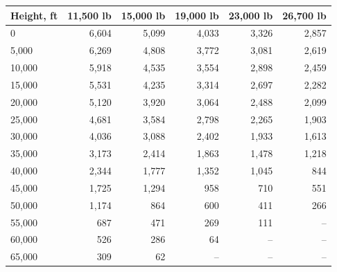 \begin{tabular}{@{}lrrrrr@{}}
\toprule
Height, ft & 11,500 lb & 15,000 lb & 19,000 lb & 23,000 lb & 26,700 lb \\
\midrule
0 & 6,604 & 5,099 & 4,033 & 3,326 & 2,857 \\
5,000 & 6,269 & 4,808 & 3,772 & 3,081 & 2,619 \\
10,000 & 5,918 & 4,535 & 3,554 & 2,898 & 2,459 \\
15,000 & 5,531 & 4,235 & 3,314 & 2,697 & 2,282 \\
20,000 & 5,120 & 3,920 & 3,064 & 2,488 & 2,099 \\
25,000 & 4,681 & 3,584 & 2,798 & 2,265 & 1,903 \\
30,000 & 4,036 & 3,088 & 2,402 & 1,933 & 1,613 \\
35,000 & 3,173 & 2,414 & 1,863 & 1,478 & 1,218 \\
40,000 & 2,344 & 1,777 & 1,352 & 1,045 & 844 \\
45,000 & 1,725 & 1,294 & 958 & 710 & 551 \\
50,000 & 1,174 & 864 & 600 & 411 & 266 \\
55,000 & 687 & 471 & 269 & 111 & -- \\
60,000 & 526 & 286 & 64 & -- & -- \\
65,000 & 309 & 62 & -- & -- & -- \\
\bottomrule
\end{tabular}
